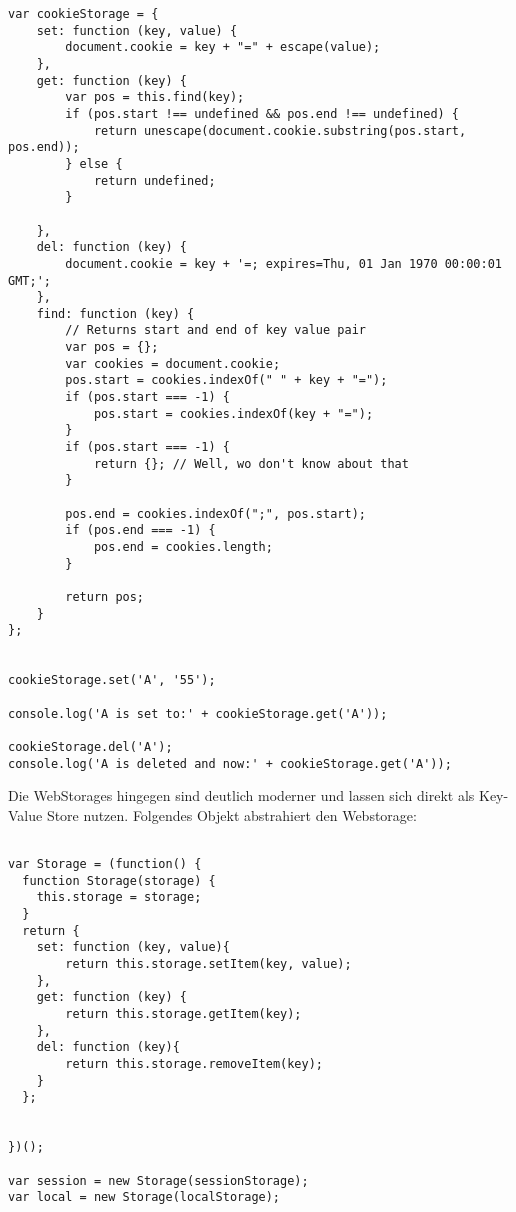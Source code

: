 \documentclass[12pt, a4paper]{article}
\begin{document}
\begin{lstlisting}
var cookieStorage = {
    set: function (key, value) {
        document.cookie = key + "=" + escape(value);
    },
    get: function (key) {
        var pos = this.find(key);
        if (pos.start !== undefined && pos.end !== undefined) {
            return unescape(document.cookie.substring(pos.start, pos.end));
        } else {
            return undefined;
        }

    },
    del: function (key) {
        document.cookie = key + '=; expires=Thu, 01 Jan 1970 00:00:01 GMT;';
    },
    find: function (key) {
        // Returns start and end of key value pair
        var pos = {};
        var cookies = document.cookie;
        pos.start = cookies.indexOf(" " + key + "=");
        if (pos.start === -1) {
            pos.start = cookies.indexOf(key + "=");
        }
        if (pos.start === -1) {
            return {}; // Well, wo don't know about that
        }

        pos.end = cookies.indexOf(";", pos.start);
        if (pos.end === -1) {
            pos.end = cookies.length;
        }

        return pos;
    }
};


cookieStorage.set('A', '55');

console.log('A is set to:' + cookieStorage.get('A'));

cookieStorage.del('A');
console.log('A is deleted and now:' + cookieStorage.get('A'));
\end{lstlisting}

Die WebStorages hingegen sind deutlich moderner und lassen sich direkt als Key-Value Store nutzen. Folgendes Objekt abstrahiert den Webstorage:

\begin{lstlisting}
 
var Storage = (function() {
  function Storage(storage) {
    this.storage = storage;
  }
  return {
	set: function (key, value){
		return this.storage.setItem(key, value);
	},
	get: function (key) {
		return this.storage.getItem(key);
	},
	del: function (key){
		return this.storage.removeItem(key);
	}
  };


})();

var session = new Storage(sessionStorage);
var local = new Storage(localStorage);
\end{lstlisting}
\end{document}
